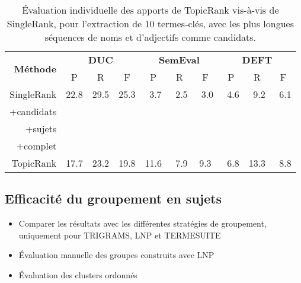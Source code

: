     \begin{table}
      \centering
      \begin{tabular}{@{~~}rc@{~~~}c@{~~~}cc@{~~~}c@{~~~}cc@{~~~}c@{~~~}c@{~~}}
        \toprule
        \multirow{2}{*}[-2pt]{\textbf{Méthode}} & \multicolumn{3}{c}{\textbf{DUC}} & \multicolumn{3}{c}{\textbf{SemEval}} & \multicolumn{3}{c}{\textbf{DEFT}}\\
        \cmidrule(lr){2-4}\cmidrule(lr){5-7}\cmidrule(lr){8-10}
        & P & R & F & P & R & F & P & R & F\\
        \midrule
        SingleRank & 22.8 & 29.5 & 25.3 & $~~$3.7 & $~~$2.5 & $~~$3.0 & $~~$4.6 & $~~$9.2 & $~~$6.1\\
        +candidats & & & & & & & & &\\
        +sujets & & & & & & & & &\\
        +complet & & & & & & & & &\\
        TopicRank & 17.7 & 23.2 & 19.8 & 11.6 & $~~$7.9 & 9.3 & $~~$6.8 & 13.3 & $~~$8.8\\
        \bottomrule
      \end{tabular}
      \caption{Évaluation individuelle des apports de TopicRank vis-à-vis de
               SingleRank, pour l'extraction de $10$ termes-clés, avec les plus
               longues séquences de noms et d'adjectifs comme candidats.
               \label{tab:ameliorations_de_singlerank}}
    \end{table}

  \subsection{Efficacité du groupement en sujets}
  \label{subsec:efficacite_du_groupement_en_sujets}
    \begin{itemize}
      \item{Comparer les résultats avec les différentes stratégies de
            groupement, uniquement pour TRIGRAMS, LNP et TERMESUITE}
      \item{Évaluation manuelle des groupes construits avec LNP}
      \item{Évaluation des clusters ordonnés}
    \end{itemize}

